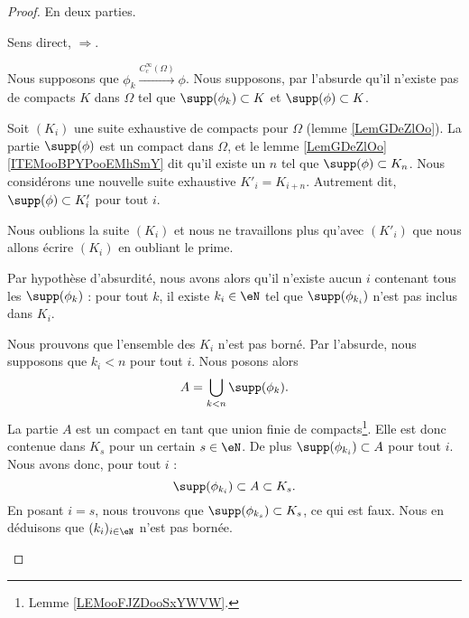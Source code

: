 \begin{proof}
	En deux parties.
	\begin{proofpart}
		Sens direct, \( \Rightarrow\).
	\end{proofpart}

	Nous supposons que \( \phi_k\stackrel{ C^{\infty}_c(\Omega)}{\longrightarrow} \phi\). Nous supposons, par l'absurde qu'il n'existe pas de compacts \( K\) dans \( \Omega\) tel que \( \supp(\phi_k)\subset K\) et \( \supp(\phi)\subset K\).

	\begin{subproof}

		Soit \( (K_i)\) une suite exhaustive de compacts pour \( \Omega\) (lemme \ref{LemGDeZlOo}). La partie \( \supp(\phi)\) est un compact dans \( \Omega\), et le lemme \ref{LemGDeZlOo}\ref{ITEMooBPYPooEMhSmY} dit qu'il existe un \( n\) tel que \( \supp(\phi)\subset K_n\). Nous considérons une nouvelle suite exhaustive \( K'_i=K_{i+n}\). Autrement dit, \( \supp(\phi)\subset K'_i\) pour tout \( i\).

		Nous oublions la suite \( (K_i)\) et nous ne travaillons plus qu'avec \( (K'_i)\) que nous allons écrire \( (K_i)\) en oubliant le prime.

		\spitem[Les \( k_i\)]

		Par hypothèse d'absurdité, nous avons alors qu'il n'existe aucun \( i\) contenant tous les \( \supp(\phi_k)\) : pour tout \( k\), il existe \( k_i\in \eN\) tel que \( \supp(\phi_{k_i})\) n'est pas inclus dans \( K_i\).

		Nous prouvons que l'ensemble des \( K_i\) n'est pas borné. Par l'absurde, nous supposons que \( k_i<n\) pour tout \( i\). Nous posons alors
		\begin{equation}
			A=\bigcup_{k<n}\supp(\phi_{k}).
		\end{equation}
		La partie \( A\) est un compact en tant que union finie de compacts\footnote{Lemme \ref{LEMooFJZDooSxYWVW}.}. Elle est donc contenue dans \( K_s\) pour un certain \( s\in \eN\). De plus \( \supp(\phi_{k_i})\subset A\) pour tout \( i\). Nous avons donc, pour tout \( i\) :
		\begin{equation}
			\supp(\phi_{k_i})\subset A\subset K_s.
		\end{equation}
		En posant \( i=s\), nous trouvons que \( \supp(\phi_{k_s})\subset K_s\), ce qui est faux. Nous en déduisons que \( (k_i)_{i\in \eN}\) n'est pas bornée.


\end{subproof}
\end{proof}
